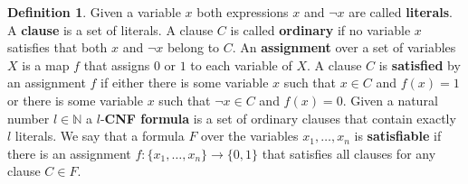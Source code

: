 \documentclass[12pt,notitlepage,a4paper]{article}
\theoremstyle{definition}
\newtheorem{definition}{Definition}[section]
\newcommand{\N}{\mathbb{N}}
\begin{document}
\begin{definition}\label{def:CNF}
Given a variable $x$ both expressions
$x$ and $\neg x$ are called \textbf{literals}. A \textbf{clause}
is a set of literals. A clause $C$ is called \textbf{ordinary}
if no variable $x$ satisfies that both $x$ and $\neg x$
belong to $C$. An \textbf{assignment} over a set of variables $X$ is a 
map $f$ that assigns $0$ or $1$ to each variable of $X$. A clause $C$
is \textbf{satisfied} by an assignment $f$ if either there is some variable $x$
such that $x\in C$ and $f(x)=1$ or there is some variable $x$ such that
$\neg x\in C$ and $f(x)=0$. 
Given a natural number $l\in\N$
a $l$-\textbf{CNF formula} is a set of  ordinary clauses 
that contain exactly $l$ literals. 
We say that a formula $F$
over the variables $x_1,\dots, x_n$ is \textbf{satisfiable} if there is an
assignment $f:\{x_1,\dots, x_n\}\rightarrow \{0,1\}$ that satisfies all clauses
for any clause $C\in F$. 
\end{definition}
\end{document}
